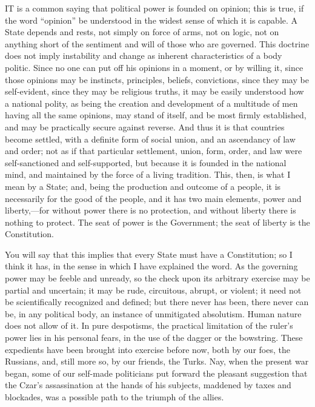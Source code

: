 IT is
a common saying that political power is founded on opinion; this is
true, if the word ``opinion'' be understood in the widest sense of which
it is capable. A State depends and rests, not simply on force of arms,
not on logic, not on anything short of the sentiment and will of those
who are governed. This doctrine does not imply instability and change
as inherent characteristics of a body politic. Since no one can put
off his opinions in a moment, or by willing it, since those opinions
may be instincts, principles, beliefs, convictions, since they may be
self-evident, since they may be religious truths, it may be easily
understood how a national polity, as being the creation and
development of a multitude of men having all the same opinions, may
stand of itself, and be most firmly established, and may be
practically secure against reverse. And thus it is that countries
become settled, with a definite form of social union, and an
ascendancy of law and order; not as if that particular settlement,
union, form, order, and law were self-sanctioned and self-supported,
but because it is founded in the national mind, and maintained by the
force of a living tradition. This, then, is what I mean by a State;
and, being the production and outcome of a people, it is necessarily
for the good of the people, and it has two main elements, power and
liberty,—for without power there is no protection, and without
liberty there is nothing to protect. The seat of power is the
Government; the seat of liberty is the Constitution.

You will say that this implies that every State
must have a Constitution; so I think it has, in the sense in which I
have explained the word. As the governing power may be feeble and
unready, so the check upon its arbitrary exercise may be partial and
uncertain; it may be rude, circuitous, abrupt, or violent; it need not
be scientifically recognized and defined; but there never has been,
there never can be, in any political body, an instance of unmitigated
absolutism. Human nature does not allow of it. In pure despotisms, the
practical limitation of the ruler's power lies in his personal fears,
in the use of the dagger or the bowstring. These expedients have been
brought into exercise before now, both by our foes, the Russians, and,
still more so, by our friends, the Turks. Nay, when the present war
began, some of our self-made politicians put forward the pleasant
suggestion that the Czar's assassination at the hands of his subjects,
maddened by taxes and blockades, was a possible path to the triumph of
the allies.

